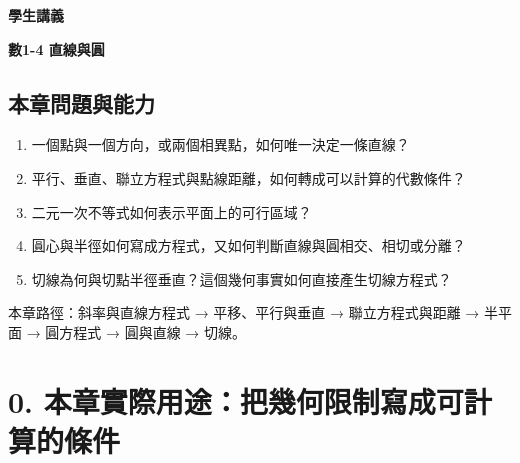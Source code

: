 \documentclass[11pt,a4paper]{article}
\providecommand{\tightlist}{%
  \setlength{\itemsep}{0pt}\setlength{\parskip}{0pt}}
\begin{document}
\begin{tcolorbox}[
  enhanced,colback=white,colframe=HandoutBlue,boxrule=1.1pt,arc=2mm,
  borderline west={3pt}{0pt}{HandoutBlue},left=5mm,right=4mm,top=4mm,bottom=4mm
]
{\sffamily\small\bfseries\color{HandoutBlue}學生講義}\par
{\sffamily\bfseries\LARGE\color{HandoutInk}數1-4 直線與圓}\par
\vspace{0.35em}{\large 用方程描述方向、距離、可行區域與圓形邊界}\par
{}\par
{}\par
\end{tcolorbox}


\begin{HandoutLearningMap}

\subsection{本章問題與能力}\label{ux672cux7ae0ux554fux984cux8207ux80fdux529b}

\begin{enumerate}
\def\labelenumi{\arabic{enumi}.}
\tightlist
\item
  一個點與一個方向，或兩個相異點，如何唯一決定一條直線？
\item
  平行、垂直、聯立方程式與點線距離，如何轉成可以計算的代數條件？
\item
  二元一次不等式如何表示平面上的可行區域？
\item
  圓心與半徑如何寫成方程式，又如何判斷直線與圓相交、相切或分離？
\item
  切線為何與切點半徑垂直？這個幾何事實如何直接產生切線方程式？
\end{enumerate}

本章路徑：斜率與直線方程式 → 平移、平行與垂直 → 聯立方程式與距離 → 半平面 → 圓方程式 → 圓與直線 → 切線。

\end{HandoutLearningMap}

\section{0. 本章實際用途：把幾何限制寫成可計算的條件}\label{ux672cux7ae0ux5be6ux969bux7528ux9014ux628aux5e7eux4f55ux9650ux5236ux5bebux6210ux53efux8a08ux7b97ux7684ux689dux4ef6}
\end{document}
